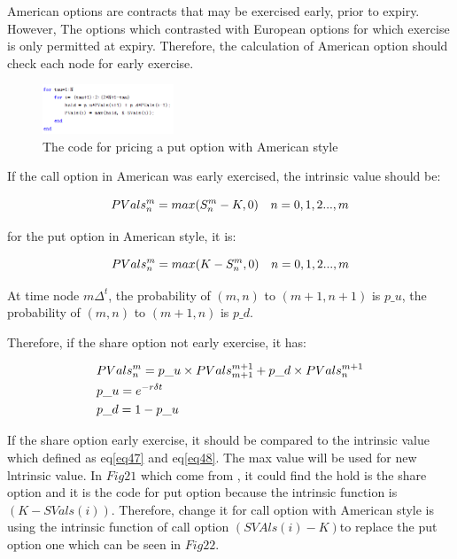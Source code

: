 \documentclass[sigconf]{acmart}
\begin{document}
American options are contracts that may be exercised early, prior to expiry. However, The options which contrasted with European options for which exercise is only permitted at expiry. Therefore, the calculation of American option should check each node for early exercise. 

\begin{figure}[htbp]
    \centering
    \includegraphics[width=0.35\textwidth]{23.png}
    \caption{\label{}The code for pricing a put option with American style\cite{brandimarte2013numerical}}
\end{figure}

If the call option in American was early exercised, the intrinsic value should be:

\begin{equation} \label{eq47}
\setlength{\abovedisplayskip}{3pt}
\setlength{\belowdisplayskip}{9pt}
PVals_{n}^{m}=max(S_{n}^{m}-K,0) \quad n=0,1,2...,m
\end{equation}

for the put option in American style, it is:

\begin{equation} \label{eq48}
\setlength{\abovedisplayskip}{3pt}
\setlength{\belowdisplayskip}{9pt}
PVals_{n}^{m}=max(K-S_{n}^{m},0) \quad n=0,1,2...,m
\end{equation}

At time node $m\Delta^{t}$, the probability of $(m,n)$ to $(m+1,n+1)$ is $p\_u$, the probability of $(m,n)$ to $(m+1,n)$ is $p\_d$. 

Therefore, if the share option not early exercise, it has:

\begin{equation} \label{eq49}
\setlength{\abovedisplayskip}{3pt}
\setlength{\belowdisplayskip}{9pt}
\begin{split}
&PVals_{n}^{m}=p\_u\times PVals_{m+1}^{m+1}+p\_d\times PVals_{n}^{m+1} \\
&p\_u = e^{-r\delta t}\\
&p\_d = 1 - p\_u
\end{split}
\end{equation}

If the share option early exercise, it should be compared to the intrinsic value which defined as eq\eqref{eq47} and eq\eqref{eq48}. The max value will be used for new lntrinsic value. In $Fig21$ which come from \cite{brandimarte2013numerical}, it could find the hold is the share option and it is the code for put option because the intrinsic function is $(K-SVals(i))$. Therefore, change it for call option with American style is using the intrinsic function of call option $(SVAls(i)-K)$to replace the put option one which can be seen in $Fig22$.
\end{document}
